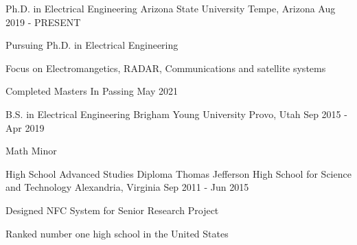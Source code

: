 

\begin{cventries}

    \cventry
    {Ph.D. in Electrical Engineering} %
    {Arizona State University} %
    {Tempe, Arizona} %
    {Aug 2019 - PRESENT} %
    {
        \begin{cvitems} %
        \item {Pursuing Ph.D. in Electrical Engineering}
        \item {Focus on Electromangetics, RADAR, Communications and satellite systems}
        \item {Completed Masters In Passing May 2021}
        \end{cvitems}
    }

    \cventry
    {B.S. in Electrical Engineering} %
    {Brigham Young University} %
    {Provo, Utah} %
    {Sep 2015 - Apr 2019} %
    {
        \begin{cvitems} %
        \item {Math Minor}
        \end{cvitems}
    }

    \cventry
    {High School Advanced Studies Diploma} %
    {Thomas Jefferson High School for Science and Technology} %
    {Alexandria, Virginia} %
    {Sep 2011 - Jun 2015} %
    {
        \begin{cvitems} %
        \item {Designed NFC System for Senior Research Project}
        \item {Ranked number one high school in the United States} 
        \end{cvitems}
    }

\end{cventries}
